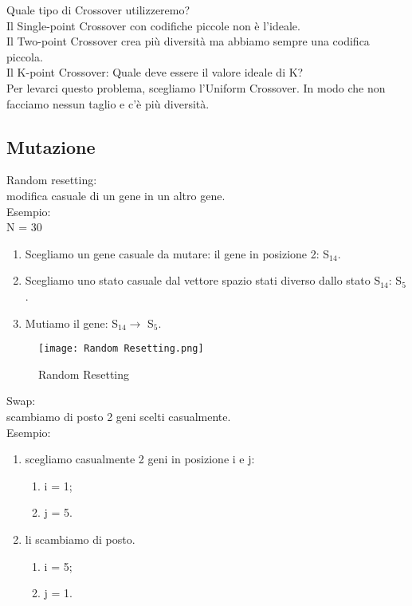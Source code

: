 \documentclass[10pt,a4paper]{article}
\begin{document}
    Quale tipo di Crossover utilizzeremo?\\
    Il Single-point Crossover con codifiche piccole non è l’ideale.\\
    Il Two-point Crossover crea più diversità ma abbiamo sempre una codifica piccola.\\
    Il K-point Crossover: Quale deve essere il valore ideale di K?\\
    Per levarci questo problema, scegliamo l’Uniform Crossover. In modo che non facciamo nessun taglio 
    e c’è più diversità.\\
    
    \subsection{Mutazione}
    \label{Mutazione}
    Random resetting:\\
    modifica casuale di un gene in un altro gene.\\
    Esempio:\\
    N = 30\\
    \begin{enumerate}
      \item Scegliamo un gene casuale da mutare: il gene in posizione 2: S$_{14}$.
      \item Scegliamo uno stato casuale dal vettore spazio stati diverso dallo stato S$_{14}$: S$_{5}$.
      \item Mutiamo il gene: S$_{14} \rightarrow$ S$_{5}$.
    \end{enumerate}
    \begin{figure}[h!]
      \centering
      \caption{Random Resetting}
      \texttt{[image: Random Resetting.png]}
      \label{Random Resetting}
    \end{figure}
    
    Swap:\\
    scambiamo di posto 2 geni scelti casualmente.\\
    Esempio:\\
    \begin{enumerate}
    	\item scegliamo casualmente 2 geni in posizione i e j: 
    	\begin{enumerate}
    		\item i = 1;
    		\item j = 5.
    	\end{enumerate}
    	\item li scambiamo di posto.
    	\begin{enumerate}
    		\item i = 5;
    		\item j = 1.
    	\end{enumerate}
    \end{enumerate}
    
\end{document}
